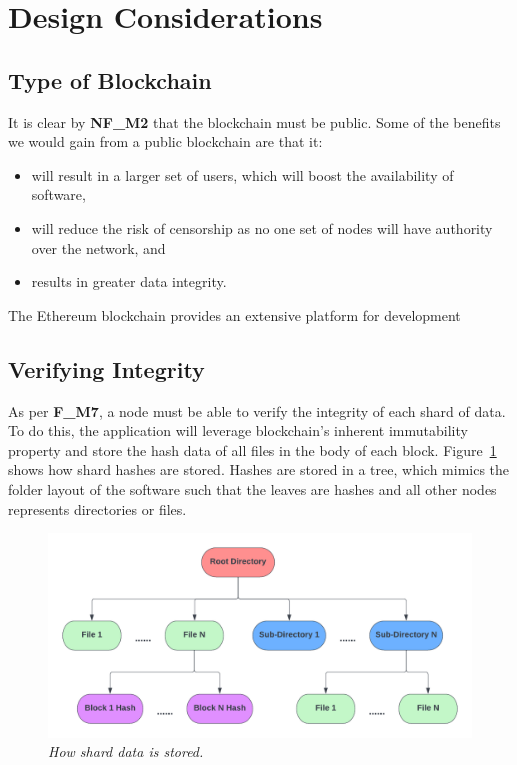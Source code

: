 
\section{Design Considerations}

\subsection*{Type of Blockchain}

It is clear by \textbf{NF\_M2} that the blockchain must be public. Some of the benefits we would gain from a public blockchain are that it:

\begin{itemize}
  \item will result in a larger set of users, which will boost the availability of software,
  \item will reduce the risk of censorship as no one set of nodes will have authority over the network, and
  \item results in greater data integrity.
\end{itemize}

The Ethereum blockchain provides an extensive platform for development

\subsection*{Verifying Integrity}

As per \textbf{F\_M7}, a node must be able to verify the integrity of each shard of data. To do this, the application will leverage blockchain's inherent immutability property and store the hash data of all files in the body of each block.
\x
Figure~\ref{fig:hash-storage} shows how shard hashes are stored. Hashes are stored in a tree, which mimics the folder layout of the software such that the leaves are hashes and all other nodes represents directories or files. 

\begin{figure}[ht]
  \centering
  \includegraphics[width=.85\textwidth]{images/diagrams/block-body.png}
  \caption{\textit{How shard data is stored.}}
  \label{fig:hash-storage}
\end{figure}

